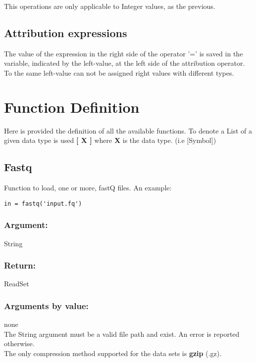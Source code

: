 \documentclass{article}
\begin{document}
This operations are only applicable to Integer values, as the previous.

\subsection{Attribution expressions}

The value of the expression in the right side of the operator '=' is saved in the variable, indicated by the left-value, at the left side of the attribution operator.\\

\noindent
To the same left-value can not be assigned right values with different types.

\section{Function Definition}
\label{sec:functions}

Here is provided the definition of all the available functions. To denote a List of a given data type is used \textbf{[ X ]} where \textbf{X} is the data type. (i.e [Symbol])

\subsection{Fastq}

Function to load, one or more, fastQ files. An example:
\begin{verbatim}
in = fastq('input.fq')
\end{verbatim}

\subsubsection*{Argument:}
String

\subsubsection*{Return:}
ReadSet

\subsubsection*{Arguments by value:}
none\\

\noindent
The String argument must be a valid file path and exist. An error is reported otherwise.\\

\noindent
The only compression method supported for the data sets is \textbf{gzip} (.gz). \\
\end{document}
